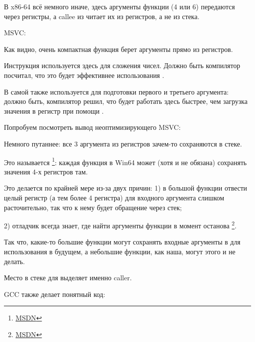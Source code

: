 
В x86-64 всё немного иначе, здесь аргументы функции (4 или 6) передаются через регистры, 
а \gls{callee} из читает их из регистров, а не из стека.


\Optimizing MSVC:



Как видно, очень компактная функция \ttf берет аргументы прямо из регистров.

Инструкция \LEA используется здесь для сложения чисел. 
Должно быть компилятор посчитал, что это будет эффективнее использования .

В самой \main{} \LEA{} также используется для подготовки первого и третьего аргумента: должно быть,
компилятор решил, что \LEA{} будет работать здесь быстрее, чем загрузка значения в регистр при помощи \MOV.

Попробуем посмотреть вывод неоптимизирующего MSVC:



Немного путаннее: все 3 аргумента из регистров зачем-то сохраняются в стеке.

\label{shadow_space}
Это называется  \footnote{\href{http://go.yurichev.com/17256}{MSDN}}: 
каждая функция в Win64 может (хотя и не обязана) сохранять значения 4-х регистров там.

Это делается по крайней мере из-за двух причин: 
1) в большой функции отвести целый регистр (а тем более 4 регистра) для входного аргумента 
слишком расточительно, так что к нему будет обращение через стек;

2) отладчик всегда знает, где найти аргументы функции в момент останова
\footnote{\href{http://go.yurichev.com/17257}{MSDN}}.

Так что, какие-то большие функции могут сохранять входные аргументы в  
для использования в будущем, а небольшие функции, как наша, могут этого и не делать.

Место в стеке для  выделяет именно \gls{caller}.


\Optimizing GCC также делает понятный код:



